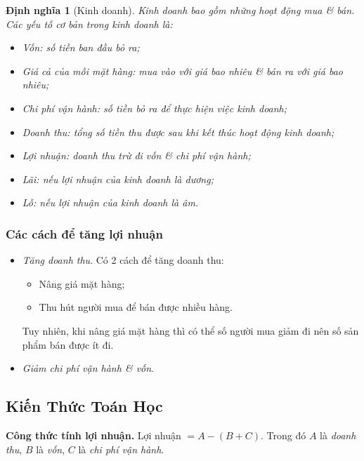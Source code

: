 \documentclass{article}
\numberwithin{equation}{section}
\newtheorem{definition}{Định nghĩa}[section]
\begin{document}
\begin{definition}[Kinh doanh]
	\emph{Kinh doanh} bao gồm những hoạt động mua \& bán. Các yếu tố cơ bản trong kinh doanh là:
	\begin{itemize}
		\item \emph{Vốn:} số tiền ban đầu bỏ ra;
		\item \emph{Giá cả của mỗi mặt hàng:} mua vào với giá bao nhiêu \& bán ra với giá bao nhiêu;
		\item \emph{Chi phí vận hành:} số tiền bỏ ra để thực hiện việc kinh doanh;
		\item \emph{Doanh thu:} tổng số tiền thu được sau khi kết thúc hoạt động kinh doanh;
		\item \emph{Lợi nhuận:} doanh thu trừ đi vốn \& chi phí vận hành;
		\item \emph{Lãi:} nếu lợi nhuận của kinh doanh là dương;
		\item \emph{Lỗ:} nếu lợi nhuận của kinh doanh là âm.
	\end{itemize}
\end{definition}

\subsubsection{Các cách để tăng lợi nhuận}

\begin{itemize}
	\item \textit{Tăng doanh thu}. Có 2 cách để tăng doanh thu:
	\begin{itemize}
		\item Nâng giá mặt hàng;
		\item Thu hút người mua để bán được nhiều hàng.
	\end{itemize}
	Tuy nhiên, khi nâng giá mặt hàng thì có thể số người mua giảm đi nên số sản phẩm bán được ít đi.
	\item \textit{Giảm chi phí vận hành \& vốn}.
\end{itemize}

\subsection{Kiến Thức Toán Học}

\begin{tcolorbox}
	\textbf{Công thức tính lợi nhuận.} Lợi nhuận $= A - (B + C)$. Trong đó $A$ là \textit{doanh thu}, $B$ là \textit{vốn}, $C$ là \textit{chi phí vận hành}.
\end{tcolorbox}
\end{document}
